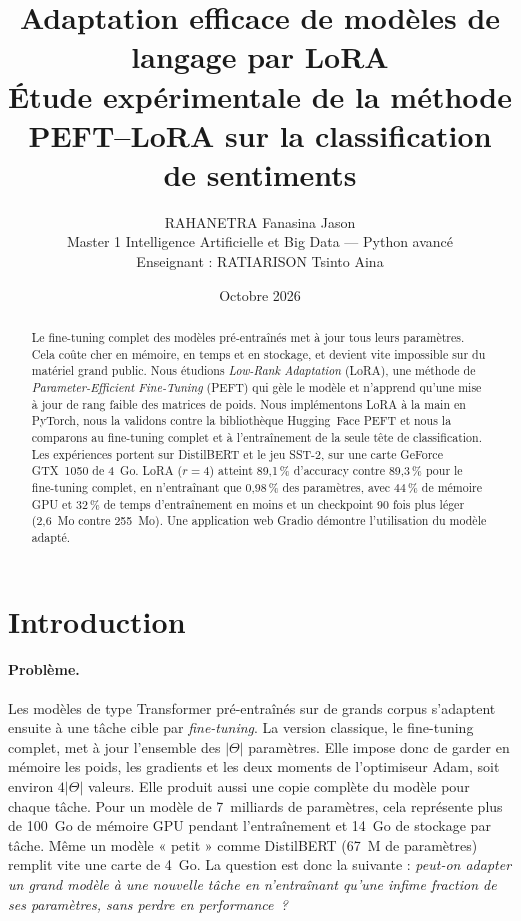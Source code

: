 \documentclass[11pt,a4paper]{article}
\title{\textbf{Adaptation efficace de modèles de langage par LoRA}\\[0.3em]
\large Étude expérimentale de la méthode PEFT--LoRA sur la classification de sentiments}
\author{RAHANETRA Fanasina Jason\\
\small Master 1 Intelligence Artificielle et Big Data --- Python avancé\\
\small Enseignant : RATIARISON Tsinto Aina}
\date{Octobre 2026}
\begin{document}
\maketitle

\begin{abstract}
\noindent Le fine-tuning complet des modèles pré-entraînés met à jour tous leurs paramètres. Cela coûte cher en mémoire, en temps et en stockage, et devient vite impossible sur du matériel grand public. Nous étudions \emph{Low-Rank Adaptation} (LoRA), une méthode de \emph{Parameter-Efficient Fine-Tuning} (PEFT) qui gèle le modèle et n'apprend qu'une mise à jour de rang faible des matrices de poids. Nous implémentons LoRA à la main en PyTorch, nous la validons contre la bibliothèque Hugging~Face PEFT et nous la comparons au fine-tuning complet et à l'entraînement de la seule tête de classification. Les expériences portent sur DistilBERT et le jeu SST-2, sur une carte GeForce GTX~1050 de 4~Go. LoRA ($r=4$) atteint 89,1\,\% d'accuracy contre 89,3\,\% pour le fine-tuning complet, en n'entraînant que 0,98\,\% des paramètres, avec $44\,\%$ de mémoire GPU et $32\,\%$ de temps d'entraînement en moins et un checkpoint 90 fois plus léger (2,6~Mo contre 255~Mo). Une application web Gradio démontre l'utilisation du modèle adapté.
\end{abstract}

\section{Introduction}
\paragraph{Problème.} Les modèles de type Transformer \cite{vaswani2017} pré-entraînés sur de grands corpus s'adaptent ensuite à une tâche cible par \emph{fine-tuning}. La version classique, le fine-tuning complet, met à jour l'ensemble des $|\Theta|$ paramètres. Elle impose donc de garder en mémoire les poids, les gradients et les deux moments de l'optimiseur Adam, soit environ $4|\Theta|$ valeurs. Elle produit aussi une copie complète du modèle pour chaque tâche. Pour un modèle de 7~milliards de paramètres, cela représente plus de 100~Go de mémoire GPU pendant l'entraînement et 14~Go de stockage par tâche. Même un modèle « petit » comme DistilBERT (67~M de paramètres) remplit vite une carte de 4~Go. La question est donc la suivante : \emph{peut-on adapter un grand modèle à une nouvelle tâche en n'entraînant qu'une infime fraction de ses paramètres, sans perdre en performance~?}
\end{document}
